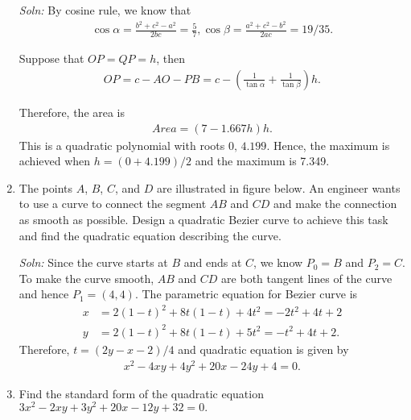 \documentclass{article}
\begin{document}
\begin{enumerate}
  \emph{Soln:} By cosine rule, we know that
  \begin{align*}
    \cos \alpha = \frac{ b^2+c^2-a^2}{2bc}=\frac{5}{7}, \cos \beta = \frac{ a^2+c^2-b^2}{2ac} = 19/35.
  \end{align*}

  Suppose that $OP = QP = h$, then
  \begin{align*}
    OP = c - AO - PB = c - \left(\frac{1}{\tan\alpha}+\frac{1}{\tan\beta}\right)h.
  \end{align*}

  Therefore, the area is
  \begin{align*}
    Area = (7-1.667 h ) h . 
  \end{align*}
  This is a quadratic polynomial with roots $0,\,4.199$. Hence, the maximum is achieved when $h = (0+4.199)/2$ and the maximum is 7.349.
\newpage
\item The points $A$, $B$, $C$, and $D$ are illustrated in figure below. An engineer wants to use a curve to connect the segment $AB$ and $CD$ and make the connection as smooth as possible. Design a quadratic Bezier curve to achieve this task and find the quadratic equation describing the curve.

  \begin{figure}[ht]
    \centering
  \end{figure}

  \emph{Soln:} Since the curve starts at $B$ and ends at $C$, we know $P_0 = B$ and $P_2 = C$. To make the curve smooth, $AB$ and $CD$ are both tangent lines of the curve and hence $P_1 =(4,4) $. The parametric equation for Bezier curve is
  \begin{align*}
    x &= 2(1-t)^2 + 8t(1-t)+4t^2 = -2t^2+4t+2  \\
    y &= 2(1-t)^2 + 8t(1-t)+5t^2 = -t^2+4t+2.
  \end{align*}
  Therefore, $t = (2y-x-2)/4$ and quadratic equation is given by
  \begin{align*}
   x^2-4xy+4y^2+20x-24y+4=0. 
  \end{align*}
\newpage
\item Find the standard form of the quadratic equation $3x^2 - 2xy + 3y^2 + 20x -12y +32 = 0.$


\end{enumerate}
\end{document}
